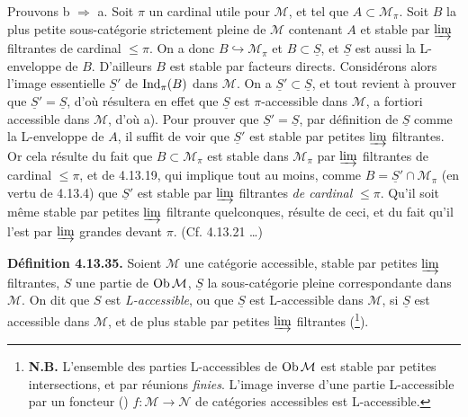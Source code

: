 Prouvons b $\Longrightarrow$ a. Soit $\pi$ un cardinal utile pour $\mathcal{M}$, et tel que $A \subset \mathcal{M}_\pi$. Soit $B$ la plus petite sous-catégorie strictement pleine de $\mathcal{M}$ contenant $A$ et stable par $\varinjlim$ filtrantes de cardinal $\leqslant \pi$. On a donc $B \hookrightarrow \mathcal{M}_\pi$ et $B \subset \underline{S}$, et $\underline{S}$ est aussi la L-enveloppe de $B$. D'ailleurs $B$ est stable par
facteurs directs. Considérons alors l'image essentielle $\underline{S}'$ de $\operatorname{Ind}_\pi(B)$ dans $\mathcal{M}$. On a $\underline{S}' \subset \underline{S}$, et tout revient à prouver que $\underline{S}' = \underline{S}$, d'où résultera en effet que $\underline{S}$ est $\pi$-accessible dans $\mathcal{M}$, a fortiori accessible dans $\mathcal{M}$, d'où a). Pour prouver que $\underline{S}' = \underline{S}$, par définition de $\underline{S}$ comme la L-enveloppe de $A$, il suffit de voir que $\underline{S}'$ est stable par petites $\varinjlim$ filtrantes. Or cela résulte du fait que $B \subset \mathcal{M}_\pi$ est stable dans $\mathcal{M}_\pi$ par $\varinjlim$ filtrantes de cardinal $\leqslant \pi$, et de 4.13.19, qui implique tout au moins, comme $B = \underline{S}' \cap \mathcal{M}_\pi$ (en vertu de 4.13.4) que $\underline{S}'$ est stable par $\varinjlim$ filtrantes \textit{de cardinal} $\leqslant \pi$. Qu'il soit même stable par petites $\varinjlim$ filtrante quelconques, résulte de ceci, et du fait qu'il l'est par $\varinjlim$ grandes devant $\pi$. (Cf. 4.13.21 \dots) %


\textbf{Définition 4.13.35.} Soient $\mathcal{M}$ une catégorie accessible, stable par petites $\varinjlim$ filtrantes, $S$ une partie de $\operatorname{Ob} \mathcal{M}$, $\underline{S}$ la sous-catégorie pleine correspondante dans $\mathcal{M}$. On dit que $S$ est \textit{L-accessible}, ou que $\underline{S}$ est L-accessible dans $\mathcal{M}$, si $\underline{S}$ est accessible dans $\mathcal{M}$, et de plus stable par petites $\varinjlim$ filtrantes (\footnote[158]{\textbf{N.B.} L'ensemble des parties L-accessibles de $\operatorname{Ob} \mathcal{M}$ est stable par petites intersections, et par réunions \textit{finies}. L'image inverse d'une partie L-accessible par un foncteur (\footnotemark[159]) $f : \mathcal{M} \longrightarrow \mathcal{N}$ de catégories accessibles est L-accessible.}).

